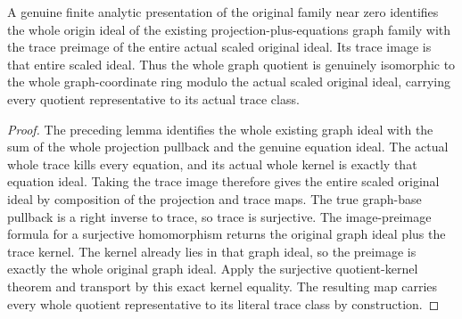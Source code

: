 \begin{lemma}
\label{hir:real-domain-whole-graph-trace-dictionary}
\leanok
A genuine finite analytic presentation of the original family near zero
identifies the whole origin ideal of the existing projection-plus-equations
graph family with the trace preimage of the entire actual scaled original
ideal. Its trace image is that entire scaled ideal. Thus the whole graph
quotient is genuinely isomorphic to the whole graph-coordinate ring modulo
the actual scaled original ideal, carrying every quotient representative to
its actual trace class.
\end{lemma}
\begin{proof}
The preceding lemma identifies the whole existing graph ideal with the sum
of the whole projection pullback and the genuine equation ideal. The actual
whole trace kills every equation, and its actual whole kernel is exactly
that equation ideal. Taking the trace image therefore gives the entire
scaled original ideal by composition of the projection and trace maps.
The true graph-base pullback is a right inverse to trace, so trace is
surjective. The image-preimage formula for a surjective homomorphism returns
the original graph ideal plus the trace kernel. The kernel already lies in
that graph ideal, so the preimage is exactly the whole original graph ideal.
Apply the surjective quotient-kernel theorem and transport by this exact
kernel equality. The resulting map carries every whole quotient
representative to its literal trace class by construction.
\end{proof}

